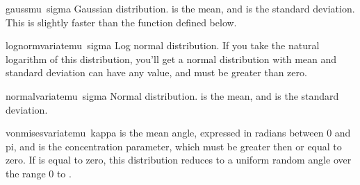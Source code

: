 \begin{funcdesc}{gauss}{mu\, sigma}
Gaussian distribution.   is the mean, and  is the
standard deviation.  This is slightly faster than the
 function defined below.
\end{funcdesc}

\begin{funcdesc}{lognormvariate}{mu\, sigma}
Log normal distribution.  If you take the natural logarithm of this
distribution, you'll get a normal distribution with mean  and
standard deviation    can have any value, and 
must be greater than zero.  
\end{funcdesc}

\begin{funcdesc}{normalvariate}{mu\, sigma}
Normal distribution.   is the mean, and  is the
standard deviation.
\end{funcdesc}

\begin{funcdesc}{vonmisesvariate}{mu\, kappa}
 is the mean angle, expressed in radians between 0 and pi,
and  is the concentration parameter, which must be greater
then or equal to zero.  If  is equal to zero, this
distribution reduces to a uniform random angle over the range 0 to
.
\end{funcdesc}


\begin{seealso}
\end{seealso}
